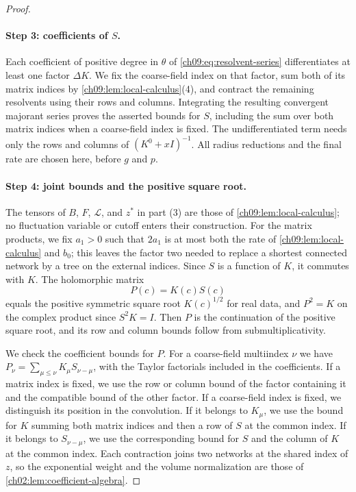 \begin{proof}
\paragraph{Step 3: coefficients of $S$.}
Each coefficient of positive degree in $\theta$ of \eqref{ch09:eq:resolvent-series} differentiates at least one factor $\Delta K$. We fix the coarse-field index on that factor, sum both of its matrix indices by \cref{ch09:lem:local-calculus}(4), and contract the remaining resolvents using their rows and columns. Integrating the resulting convergent majorant series proves the asserted bounds for $S$, including the sum over both matrix indices when a coarse-field index is fixed. The undifferentiated term needs only the rows and columns of $(K^0+xI)^{-1}$. All radius reductions and the final rate are chosen here, before $g$ and $p$.

\paragraph{Step 4: joint bounds and the positive square root.}
The tensors of $B$, $F$, $\mathcal L$, and $z^*$ in part (3) are those of \cref{ch09:lem:local-calculus}; no fluctuation variable or cutoff enters their construction. For the matrix products, we fix $a_1>0$ such that $2a_1$ is at most both the rate of \cref{ch09:lem:local-calculus} and $b_0$; this leaves the factor two needed to replace a shortest connected network by a tree on the external indices. Since $S$ is a function of $K$, it commutes with $K$. The holomorphic matrix
\begin{equation}\label{ch09:eq:positive-root}
 P(c)=K(c)S(c)
\end{equation}
equals the positive symmetric square root $K(c)^{1/2}$ for real data, and $P^2=K$ on the complex product since $S^2K=I$. Then $P$ is the continuation of the positive square root, and its row and column bounds follow from submultiplicativity.

We check the coefficient bounds for $P$. For a coarse-field multiindex $\nu$ we have $P_\nu=\sum_{\mu\le\nu}K_\mu S_{\nu-\mu}$, with the Taylor factorials included in the coefficients. If a matrix index is fixed, we use the row or column bound of the factor containing it and the compatible bound of the other factor. If a coarse-field index is fixed, we distinguish its position in the convolution. If it belongs to $K_\mu$, we use the bound for $K$ summing both matrix indices and then a row of $S$ at the common index. If it belongs to $S_{\nu-\mu}$, we use the corresponding bound for $S$ and the column of $K$ at the common index. Each contraction joins two networks at the shared index of $z$, so the exponential weight and the volume normalization are those of \cref{ch02:lem:coefficient-algebra}.


\end{proof}
